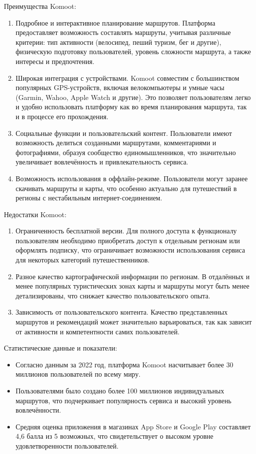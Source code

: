 Преимущества Komoot:
\begin{enumerate}
    \item Подробное и интерактивное планирование маршрутов. Платформа предоставляет возможность составлять маршруты, учитывая различные критерии: тип активности (велосипед, пеший туризм, бег и другие), физическую подготовку пользователей, уровень сложности маршрута, а также интересы и предпочтения.
    \item Широкая интеграция с устройствами. Komoot совместим с большинством популярных GPS-устройств, включая велокомпьютеры и умные часы (Garmin, Wahoo, Apple Watch и другие). Это позволяет пользователям легко и удобно использовать платформу как во время планирования маршрута, так и в процессе его прохождения.
    \item Социальные функции и пользовательский контент. Пользователи имеют возможность делиться созданными маршрутами, комментариями и фотографиями, образуя сообщество единомышленников, что значительно увеличивает вовлечённость и привлекательность сервиса.
    \item Возможность использования в оффлайн-режиме. Пользователи могут заранее скачивать маршруты и карты, что особенно актуально для путешествий в регионы с нестабильным интернет-соединением.
\end{enumerate}

\noindent Недостатки Komoot:
\begin{enumerate}
    \item Ограниченность бесплатной версии. Для полного доступа к функционалу пользователям необходимо приобретать доступ к отдельным регионам или оформлять подписку, что ограничивает возможности использования сервиса для некоторых категорий путешественников.
    \item Разное качество картографической информации по регионам. В отдалённых и менее популярных туристических зонах карты и маршруты могут быть менее детализированы, что снижает качество пользовательского опыта.
    \item Зависимость от пользовательского контента. Качество представленных маршрутов и рекомендаций может значительно варьироваться, так как зависит от активности и компетентности самих пользователей.
\end{enumerate}

\noindent Статистические данные и показатели:
\begin{itemize}
    \item Согласно данным за 2022 год, платформа Komoot насчитывает более 30 миллионов пользователей по всему миру.
    \item Пользователями было создано более 100 миллионов индивидуальных маршрутов, что подчеркивает популярность сервиса и высокий уровень вовлечённости.
    \item Средняя оценка приложения в магазинах App Store и Google Play составляет 4,6 балла из 5 возможных, что свидетельствует о высоком уровне удовлетворенности пользователей.
\end{itemize}

